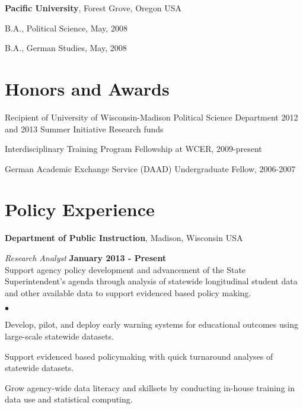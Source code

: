 \documentclass[margin,line]{res}
\newenvironment{list1}{
  \begin{list}{\ding{113}}{%
      \setlength{\itemsep}{0in}
      \setlength{\parsep}{0in} \setlength{\parskip}{0in}
      \setlength{\topsep}{0in} \setlength{\partopsep}{0in} 
      \setlength{\leftmargin}{0.17in}}}{\end{list}}
\newenvironment{list2}{
  \begin{list}{$\bullet$}{%
      \setlength{\itemsep}{0in}
      \setlength{\parsep}{0in} \setlength{\parskip}{0in}
      \setlength{\topsep}{0in} \setlength{\partopsep}{0in} 
      \setlength{\leftmargin}{0.2in}}}{\end{list}}
\begin{document}
\begin{resume}
{\bf Pacific University}, Forest Grove, Oregon USA\\
\vspace*{-.1in}
\begin{list1}
\item[] B.A., Political Science,  May, 2008
\item[] B.A., German Studies, May, 2008
\end{list1}


\section{\sc Honors and Awards} 
Recipient of University of Wisconsin-Madison Political Science Department 2012 and 2013 Summer Initiative Research funds

\vspace*{-2.5mm}
Interdisciplinary Training Program Fellowship at WCER, 2009-present


\vspace*{-2.5mm}
German Academic Exchange Service (DAAD) Undergraduate Fellow, 2006-2007




\section{\sc Policy Experience}
{\bf Department of Public Instruction}, Madison, Wisconsin USA

\vspace{-.3cm}
{\em Research Analyst} \hfill {\bf January 2013 - Present}\\
Support agency policy development and advancement of the State Superintendent's agenda through analysis of statewide longitudinal student data and other available data to support evidenced based policy making. 
\begin{list2}
\item Develop, pilot, and deploy early warning systems for educational outcomes using large-scale statewide datasets. 
\item Support evidenced based policymaking with quick turnaround analyses of statewide datasets. 
\item Grow agency-wide data literacy and skillsets by conducting in-house training in data use and statistical computing.
\end{list2}


\end{resume}
\end{document}
